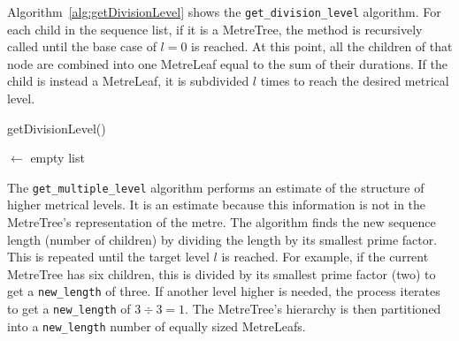 \documentclass[12pt,twoside,openright]{report}
\begin{document}
Algorithm~\ref{alg:getDivisionLevel} shows the \verb'get_division_level' algorithm. For each child in the
sequence list, if it is a MetreTree, the method is recursively called until the
base case of $l=0$ is reached. At this point, all the children of that node are
combined into one MetreLeaf equal to the sum of their durations. If the child is
instead a MetreLeaf, it is subdivided $l$ times to reach the desired metrical
level.

\begin{algorithm}[H]

    \caption{getDivisionLevel()}
    \BlankLine

    \NewSequence $\gets$ empty list\;
    \label{alg:getDivisionLevel}
\end{algorithm}

The \verb'get_multiple_level' algorithm performs an estimate of the structure of
higher metrical levels. It is an estimate because this information is not in the
MetreTree's representation of the metre. The algorithm finds the new sequence
length (number of children) by dividing the length by its smallest prime factor.
This is repeated until the target level $l$ is reached. For example, if the
current MetreTree has six children, this is divided by its smallest prime factor
(two) to get a \verb'new_length' of three. If another level higher is needed, the
process iterates to get a \verb'new_length' of $3\div3=1$. The MetreTree's
hierarchy is then partitioned into a \verb'new_length' number of equally sized
MetreLeafs.
\end{document}
